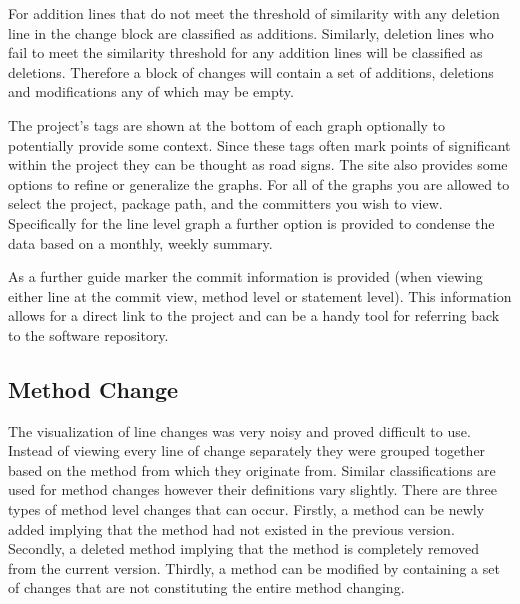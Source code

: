 For addition lines that do not meet the threshold of similarity with any deletion line in the change block are classified as additions. Similarly, deletion lines who fail to meet the similarity threshold for any addition lines will be classified as deletions. Therefore a block of changes will contain a set of additions, deletions and modifications any of which may be empty.



The project's tags are shown at the bottom of each graph optionally to potentially provide some context. Since these tags often mark points of significant within the project they can be thought as road signs. The site also provides some options to refine or generalize the graphs. For all of the graphs you are allowed to select the project, package path, and the committers you wish to view. Specifically for the line level graph a further option is provided to condense the data based on a monthly, weekly summary.

As a further guide marker the commit information is provided (when viewing either line at the commit view, method level or statement level). This information allows for a direct link to the project and can be a handy tool for referring back to the software repository.


\subsection{Method Change}

The visualization of line changes was very noisy and proved difficult to use. Instead of viewing every line of change separately they were grouped together based on the method from which they originate from. Similar classifications are used for method changes however their definitions vary slightly. There are three types of method level changes that can occur. Firstly, a method can be newly added implying that the method had not existed in the previous version. Secondly, a deleted method implying that the method is completely removed from the current version. Thirdly, a method can be modified by containing a set of changes that are not constituting the entire method changing. 

